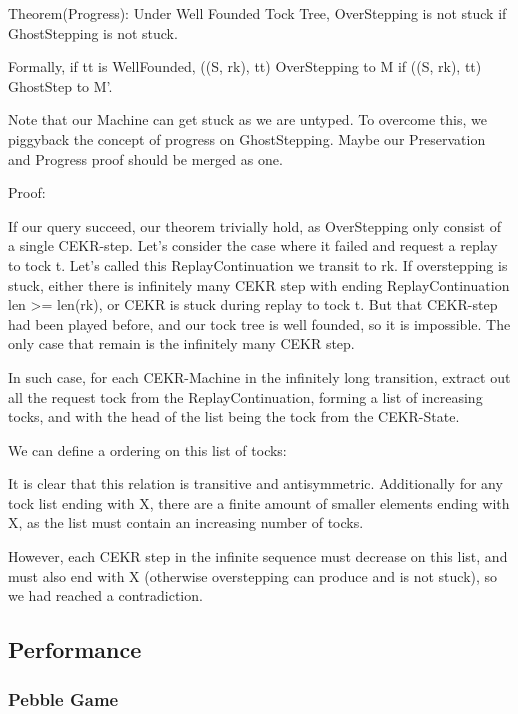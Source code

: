 Theorem(Progress): Under Well Founded Tock Tree, OverStepping is not stuck if GhostStepping is not stuck.

Formally, if tt is WellFounded, ((S, rk), tt) OverStepping to M if ((S, rk), tt) GhostStep to M'.

Note that our Machine can get stuck as we are untyped. To overcome this, we piggyback the concept of progress on GhostStepping. Maybe our Preservation and Progress proof should be merged as one.

Proof: 

If our query succeed, our theorem trivially hold, as OverStepping only consist of a single CEKR-step.
Let's consider the case where it failed and request a replay to tock t. Let's called this ReplayContinuation we transit to rk. If overstepping is stuck, either there is infinitely many CEKR step with ending ReplayContinuation len >= len(rk), or CEKR is stuck during replay to tock t. But that CEKR-step had been played before, and our tock tree is well founded, so it is impossible. The only case that remain is the infinitely many CEKR step.

In such case, for each CEKR-Machine in the infinitely long transition, extract out all the request tock from the ReplayContinuation, forming a list of increasing tocks, and with the head of the list being the tock from the CEKR-State.

We can define a ordering on this list of tocks:
It is clear that this relation is transitive and antisymmetric. Additionally for any tock list ending with X, there are a finite amount of smaller elements ending with X, as the list must contain an increasing number of tocks.

However, each CEKR step in the infinite sequence must decrease on this list, and must also end with X (otherwise overstepping can produce and is not stuck), so we had reached a contradiction.

\subsection{Performance}
\subsubsection{Pebble Game}

